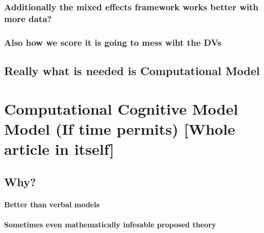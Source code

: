 \documentclass[]{book}
\let\oldparagraph\paragraph
\renewcommand{\paragraph}[1]{\oldparagraph{#1}\mbox{}}
\theoremstyle{definition}
\theoremstyle{definition}
\theoremstyle{definition}
\theoremstyle{remark}
\begin{document}
\hypertarget{additionally-the-mixed-effects-framework-works-better-with-more-data}{%
\subsubsection{Additionally the mixed effects framework works better
with more
data?}\label{additionally-the-mixed-effects-framework-works-better-with-more-data}}

\hypertarget{also-how-we-score-it-is-going-to-mess-wiht-the-dvs}{%
\subsubsection{Also how we score it is going to mess wiht the
DVs}\label{also-how-we-score-it-is-going-to-mess-wiht-the-dvs}}

\hypertarget{really-what-is-needed-is-computational-model}{%
\subsection{Really what is needed is Computational
Model}\label{really-what-is-needed-is-computational-model}}

\hypertarget{computational-cognitive-model-model-if-time-permits-whole-article-in-itself}{%
\section{Computational Cognitive Model Model (If time permits) {[}Whole
article in
itself{]}}\label{computational-cognitive-model-model-if-time-permits-whole-article-in-itself}}

\hypertarget{why-2}{%
\subsection{Why?}\label{why-2}}

\hypertarget{better-than-verbal-models}{%
\paragraph{Better than verbal models}\label{better-than-verbal-models}}

\hypertarget{sometimes-even-mathematically-infesable-proposed-theory}{%
\paragraph{Sometimes even mathematically infesable proposed
theory}\label{sometimes-even-mathematically-infesable-proposed-theory}}
\end{document}
